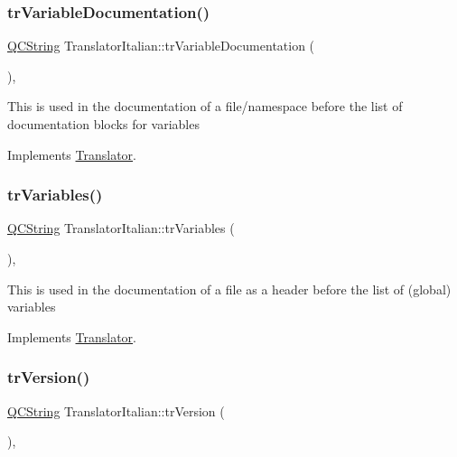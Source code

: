\subsubsection{\texorpdfstring{trVariableDocumentation()}{trVariableDocumentation()}}
{\footnotesize\ttfamily \mbox{\hyperlink{class_q_c_string}{Q\+C\+String}} Translator\+Italian\+::tr\+Variable\+Documentation (\begin{DoxyParamCaption}{ }\end{DoxyParamCaption})\hspace{0.3cm}{\ttfamily [inline]}, {\ttfamily [virtual]}}

This is used in the documentation of a file/namespace before the list of documentation blocks for variables 

Implements \mbox{\hyperlink{class_translator}{Translator}}.

\mbox{\label{class_translator_italian_a35a0b0e739fac94691b7d054f016b25b}} 
\subsubsection{\texorpdfstring{trVariables()}{trVariables()}}
{\footnotesize\ttfamily \mbox{\hyperlink{class_q_c_string}{Q\+C\+String}} Translator\+Italian\+::tr\+Variables (\begin{DoxyParamCaption}{ }\end{DoxyParamCaption})\hspace{0.3cm}{\ttfamily [inline]}, {\ttfamily [virtual]}}

This is used in the documentation of a file as a header before the list of (global) variables 

Implements \mbox{\hyperlink{class_translator}{Translator}}.

\mbox{\label{class_translator_italian_ad0ce3ecfeed3517ffbdda359e0de92cc}} 
\subsubsection{\texorpdfstring{trVersion()}{trVersion()}}
{\footnotesize\ttfamily \mbox{\hyperlink{class_q_c_string}{Q\+C\+String}} Translator\+Italian\+::tr\+Version (\begin{DoxyParamCaption}{ }\end{DoxyParamCaption})\hspace{0.3cm}{\ttfamily [inline]}, {\ttfamily [virtual]}}

